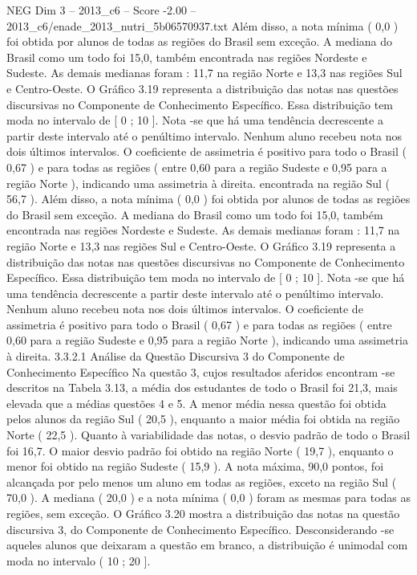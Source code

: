 \begin{textsample}{NEG Dim 3 – 2013\_c6 – Score -2.00 – 2013\_c6/enade\_2013\_nutri\_5b06570937.txt}
Além disso, a nota mínima ( 0,0 ) foi obtida por alunos de todas as regiões do Brasil sem exceção.
A mediana do Brasil como um todo foi 15,0, também encontrada nas regiões Nordeste e Sudeste.
As demais medianas foram : 11,7 na região Norte e 13,3 nas regiões Sul e Centro-Oeste.
O Gráfico 3.19 representa a distribuição das notas nas questões discursivas no Componente de Conhecimento Específico.
Essa distribuição tem moda no intervalo de [ 0 ; 10 ].
Nota -se que há uma tendência decrescente a partir deste intervalo até o penúltimo intervalo.
Nenhum aluno recebeu nota nos dois últimos intervalos.
O coeficiente de assimetria é positivo para todo o Brasil ( 0,67 ) e para todas as regiões ( entre 0,60 para a região Sudeste e 0,95 para a região Norte ), indicando uma assimetria à direita. encontrada na região Sul ( 56,7 ).
Além disso, a nota mínima ( 0,0 ) foi obtida por alunos de todas as regiões do Brasil sem exceção.
A mediana do Brasil como um todo foi 15,0, também encontrada nas regiões Nordeste e Sudeste.
As demais medianas foram : 11,7 na região Norte e 13,3 nas regiões Sul e Centro-Oeste.
O Gráfico 3.19 representa a distribuição das notas nas questões discursivas no Componente de Conhecimento Específico.
Essa distribuição tem moda no intervalo de [ 0 ; 10 ].
Nota -se que há uma tendência decrescente a partir deste intervalo até o penúltimo intervalo.
Nenhum aluno recebeu nota nos dois últimos intervalos.
O coeficiente de assimetria é positivo para todo o Brasil ( 0,67 ) e para todas as regiões ( entre 0,60 para a região Sudeste e 0,95 para a região Norte ), indicando uma assimetria à direita. 3.3.2.1 Análise da Questão Discursiva 3 do Componente de Conhecimento Específico Na questão 3, cujos resultados aferidos encontram -se descritos na Tabela 3.13, a média dos estudantes de todo o Brasil foi 21,3, mais elevada que a médias questões 4 e 5.
A menor média nessa questão foi obtida pelos alunos da região Sul ( 20,5 ), enquanto a maior média foi obtida na região Norte ( 22,5 ).
Quanto à variabilidade das notas, o desvio padrão de todo o Brasil foi 16,7.
O maior desvio padrão foi obtido na região Norte ( 19,7 ), enquanto o menor foi obtido na região Sudeste ( 15,9 ).
A nota máxima, 90,0 pontos, foi alcançada por pelo menos um aluno em todas as regiões, exceto na região Sul ( 70,0 ).
A mediana ( 20,0 ) e a nota mínima ( 0,0 ) foram as mesmas para todas as regiões, sem exceção.
O Gráfico 3.20 mostra a distribuição das notas na questão discursiva 3, do Componente de Conhecimento Específico.
Desconsiderando -se aqueles alunos que deixaram a questão em branco, a distribuição é unimodal com moda no intervalo ( 10 ; 20 ].

\end{textsample}
